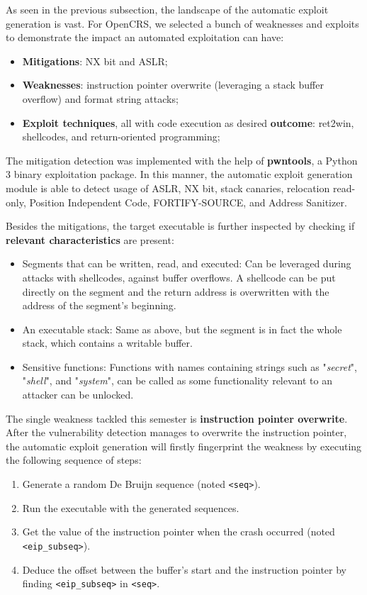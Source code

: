 \documentclass[12pt,a4paper,english,onecolumn]{IEEEtran}
\begin{document}
As seen in the previous subsection, the landscape of the automatic exploit generation is vast. For OpenCRS, we selected a bunch of weaknesses and exploits to demonstrate the impact an automated exploitation can have:

\begin{itemize}
    \item \textbf{Mitigations}: NX bit and ASLR;
    \item \textbf{Weaknesses}: instruction pointer overwrite (leveraging a stack buffer overflow) and format string attacks;
    \item \textbf{Exploit techniques}, all with code execution as desired \textbf{outcome}: ret2win, shellcodes, and return-oriented programming;
\end{itemize}

The mitigation detection was implemented with the help of \textbf{pwntools}, a Python 3 binary exploitation package. In this manner, the automatic exploit generation module is able to detect usage of ASLR, NX bit, stack canaries, relocation read-only, Position Independent Code, FORTIFY-SOURCE, and Address Sanitizer.

Besides the mitigations, the target executable is further inspected by checking if \textbf{relevant characteristics} are present:

\begin{itemize}
    \item Segments that can be written, read, and executed: Can be leveraged during attacks with shellcodes, against buffer overflows. A shellcode can be put directly on the segment and the return address is overwritten with the address of the segment's beginning.
    \item An executable stack: Same as above, but the segment is in fact the whole stack, which contains a writable buffer.
    \item Sensitive functions: Functions with names containing strings such as "\textit{secret}", "\textit{shell}", and "\textit{system}", can be called as some functionality relevant to an attacker can be unlocked.
\end{itemize}

The single weakness tackled this semester is \textbf{instruction pointer overwrite}. After the vulnerability detection manages to overwrite the instruction pointer, the automatic exploit generation will firstly fingerprint the weakness by executing the following sequence of steps:

\begin{enumerate}
    \item Generate a random De Bruijn sequence (noted \texttt{<seq>}).
    \item  Run the executable with the generated sequences.
    \item  Get the value of the instruction pointer when the crash occurred (noted \texttt{<eip_subseq>}).
    \item  Deduce the offset between the buffer's start and the instruction pointer by finding \texttt{<eip_subseq>} in \texttt{<seq>}.
\end{enumerate}
\end{document}
